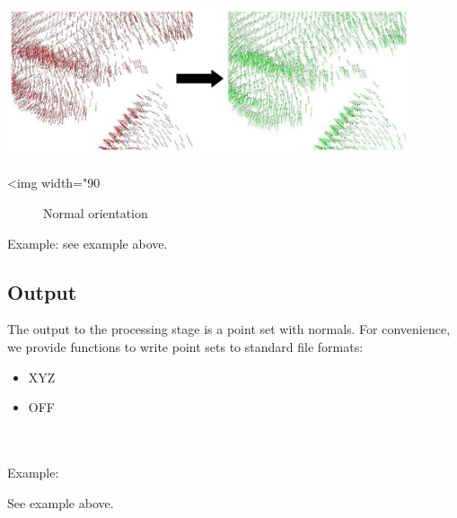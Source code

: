 \begin{center}
    \label{Point_set_processing_3-fig-mst_normal_orientation}
    \begin{ccTexOnly}
        \includegraphics[width=0.9\textwidth]{Point_set_processing_3/mst_normal_orientation} %
    \end{ccTexOnly}
    \begin{ccHtmlOnly}
        <img width="90%
    \end{ccHtmlOnly}
    \begin{figure}[h]
        \caption{Normal orientation}
    \end{figure}
\end{center}

Example: see  example above.

\subsection{Output}

The output to the processing stage is a point set with normals. For convenience, we provide functions to write point sets to standard file formats:
\begin{itemize}
\item XYZ
\item OFF
\end{itemize}

  \\
  \\

Example:

See  example above.

